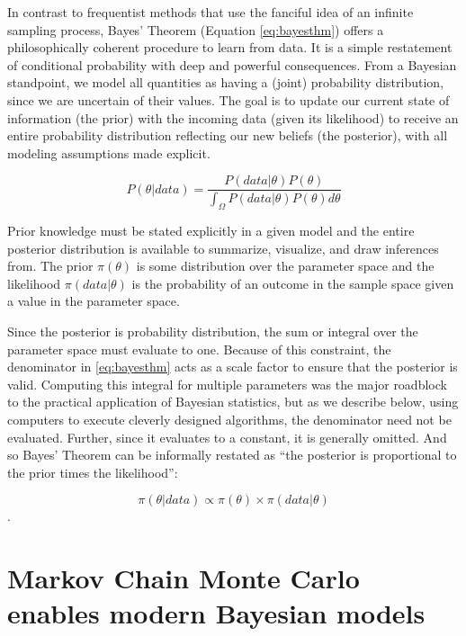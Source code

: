 \documentclass[11pt, oneside, openany]{scrbook}
\begin{document}
In contrast to frequentist methods that use the fanciful idea of an infinite sampling process, Bayes' Theorem (Equation \eqref{eq:bayesthm}) offers a philosophically coherent procedure to learn from data. It is a simple restatement of conditional probability with deep and powerful consequences. From a Bayesian standpoint, we model all quantities as having a (joint) probability distribution, since we are uncertain of their values. The goal is to update our current state of information (the prior) with the incoming data (given its likelihood) to receive an entire probability distribution reflecting our new beliefs (the posterior), with all modeling assumptions made explicit.

\begin{equation}
  P(\theta | data) = \frac{P(data | \theta) P(\theta)}{\int_\Omega P(data | \theta) P(\theta) d\theta}
  \label{eq:bayesthm}
\end{equation}

Prior knowledge must be stated explicitly in a given model and the entire posterior distribution is available to summarize, visualize, and draw inferences from. The prior \(\pi(\theta)\) is some distribution over the parameter space and the likelihood \(\pi(data | \theta)\) is the probability of an outcome in the sample space given a value in the parameter space.

Since the posterior is probability distribution, the sum or integral over the parameter space must evaluate to one. Because of this constraint, the denominator in \eqref{eq:bayesthm} acts as a scale factor to ensure that the posterior is valid. Computing this integral for multiple parameters was the major roadblock to the practical application of Bayesian statistics, but as we describe below, using computers to execute cleverly designed algorithms, the denominator need not be evaluated. Further, since it evaluates to a constant, it is generally omitted. And so Bayes' Theorem can be informally restated as ``the posterior is proportional to the prior times the likelihood'':

\[\pi(\theta \vert data) \propto \pi(\theta) \times \pi(data \vert \theta)\].

\hypertarget{markov-chain-monte-carlo-enables-modern-bayesian-models}{%
\section{Markov Chain Monte Carlo enables modern Bayesian models}\label{markov-chain-monte-carlo-enables-modern-bayesian-models}}
\end{document}
